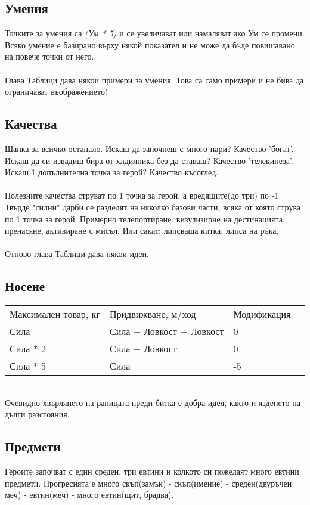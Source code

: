 \subsection{Умения}
Точките за умения са \textit{(Ум * 5)} и се увеличават или намаляват ако Ум се промени.
Всяко умение е базирано върху някой показател и не може да бъде повишавано на повече точки от него.
\\
\\
Глава Таблици дава някои примери за умения.
Това са само примери и не бива да ограничават въображението!


\subsection{Качества}
Шапка за всичко останало.
Искаш да започнеш с много пари? Качество 'богат'.
Искаш да си извадиш бира от хлдилника без да ставаш? Качество 'телекинеза'.
Искаш 1 допълнителна точка за герой? Качество късоглед.
\\
\\
Полезните качества струват по 1 точка за герой, а вредящите(до три) по -1.
Твърде "силни" дарби се разделят на няколко базови части, всяка от която струва по 1 точка за герой.
Примерно телепортиране: визулизирне на дестинацията, пренасяне, активиране с мисъл.
Или сакат: липсваща китка, липса на ръка.
\\
\\
Отново глава Таблици дава някои идеи.


\subsection{Носене}
\begin{tabular}{l | l | l | l }
Максимален товар, кг & Придвижване, м/ход       & Модификация  \\
Сила                 & Сила + Ловкост + Ловкост & 0            \\
Сила * 2             & Сила + Ловкост           & 0            \\
Сила * 5             & Сила                     & -5
\end{tabular}
\\
Очевидно хвърлянето на раницата преди битка е добра идея, както и язденето на дълги разстояния.


\subsection{Предмети}
Героите започват с един среден, три евтини и колкото си пожелаят много евтини предмети.
Прогресията е много скъп(замък) - скъп(имение) - среден(двуръчен меч) - евтин(меч) - много евтин(щит, брадва).

